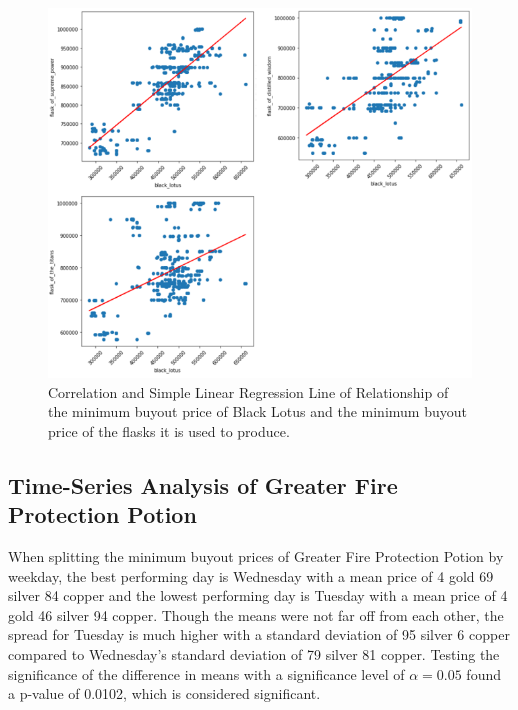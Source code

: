 \documentclass[sigconf]{acmart}
\begin{document}
\begin{figure}[h]
\centering
\includegraphics[width=\linewidth]{flask_corr}
\caption{Correlation and Simple Linear Regression Line of Relationship of the minimum buyout price of Black Lotus and the minimum buyout price of the flasks it is used to produce.}
\end{figure}

\subsection{Time-Series Analysis of Greater Fire Protection Potion}

When splitting the minimum buyout prices of Greater Fire Protection Potion by weekday, the best performing day is Wednesday with a mean price of 4 gold 69 silver 84 copper and the lowest performing day is Tuesday with a mean price of 4 gold 46 silver 94 copper. Though the means were not far off from each other, the spread for Tuesday is much higher with a standard deviation of 95 silver 6 copper compared to Wednesday’s standard deviation of 79 silver 81 copper. Testing the significance of the difference in means with a significance level of \( \alpha = 0.05 \) found a p-value of 0.0102, which is considered significant.
\end{document}

